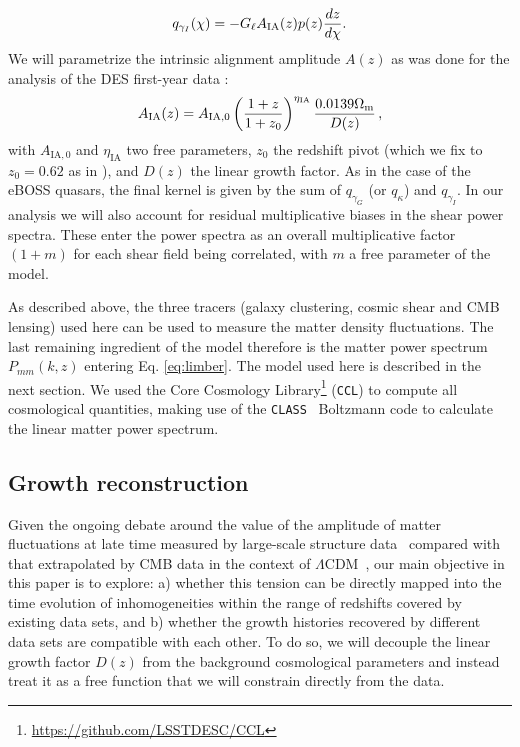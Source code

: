 \documentclass[a4paper,11pt]{article}
\newcommand{\Om}{\Omega_{\rm m}}
\newcommand{\lcdm}{$\Lambda$CDM\xspace}
\newcommand{\ccl}{\texttt{CCL}\xspace}
\newcommand{\class}{\texttt{CLASS}\xspace}
\begin{document}
\begin{itemize}
        \begin{equation}
          q_{\gamma_I}(\chi)=-G_\ell A_{\rm IA}(z)p(z)\frac{dz}{d\chi}.
        \end{equation}
        We will parametrize the intrinsic alignment amplitude $A(z)$ as was done for the analysis of the DES first-year data \cite{1708.01530, 1708.01538}:
        \begin{equation}\label{eq:ias}
          A_{\rm IA}(z)=A_{{\rm IA},0}\left( \frac{1+z}{1+z_0} \right)^{\eta_\text{IA}}\frac{0.0139 \Om}{D(z)}\,,
        \end{equation}
        with $A_{\text{IA},0}$ and $\eta_{\text{IA}}$ two free parameters, $z_0$ the redshift pivot (which we fix to $z_0=0.62$ as in \cite{1708.01530, 1708.01538}), and $D(z)$ the linear growth factor. As in the case of the eBOSS quasars, the final kernel is given by the sum of $q_{\gamma_G}$ (or $q_{\kappa}$) and $q_{\gamma_I}$.  In our analysis we will also account for residual multiplicative biases in the shear power spectra. These enter the power spectra as an overall multiplicative factor $(1+m)$ for each shear field being correlated, with $m$ a free parameter of the model.
      \end{itemize}

      As described above, the three tracers (galaxy clustering, cosmic shear and CMB lensing) used here can be used to measure the matter density fluctuations. The last remaining ingredient of the model therefore is the matter power spectrum $P_{mm}(k, z)$ entering Eq. \ref{eq:limber}. The model used here is described in the next section. We used the Core Cosmology Library\footnote{\url{https://github.com/LSSTDESC/CCL}} (\ccl) \cite{1812.05995} to compute all cosmological quantities, making use of the \class~\cite{1104.2933} Boltzmann code to calculate the linear matter power spectrum.

    \subsection{Growth reconstruction}\label{ssec:theory.growth_rec}
      Given the ongoing debate around the value of the amplitude of matter fluctuations at late time measured by large-scale structure data~\cite{1708.01530, 1708.01538, 2007.15632, 1809.09148, 2105.09545} compared with that extrapolated by CMB data in the context of \lcdm ~\cite{1807.06209,2011.11613}, our main objective in this paper is to explore: a) whether this tension can be directly mapped into the time evolution of inhomogeneities within the range of redshifts covered by existing data sets, and b) whether the growth histories recovered by different data sets are compatible with each other. To do so, we will decouple the linear growth factor $D(z)$ from the background cosmological parameters and instead treat it as a free function that we will constrain directly from the data. 
      
\end{document}
